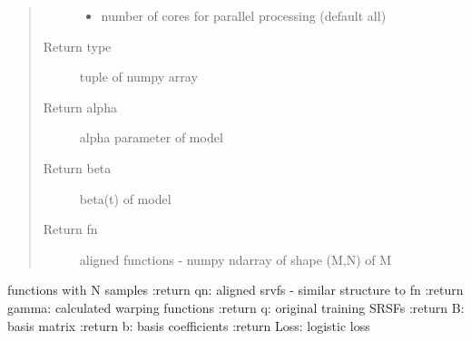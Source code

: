\documentclass[letterpaper,10pt,english]{sphinxmanual}
\begin{document}
\begin{fulllineitems}
\begin{quote}
\begin{description}
\begin{itemize}
\item {} 
 \textendash{} number of cores for parallel processing (default all)

\end{itemize}

\item[{Return type}] \leavevmode
tuple of numpy array

\item[{Return alpha}] \leavevmode
alpha parameter of model

\item[{Return beta}] \leavevmode
beta(t) of model

\item[{Return fn}] \leavevmode
aligned functions - numpy ndarray of shape (M,N) of M

\end{description}\end{quote}

functions with N samples
:return qn: aligned srvfs - similar structure to fn
:return gamma: calculated warping functions
:return q: original training SRSFs
:return B: basis matrix
:return b: basis coefficients
:return Loss: logistic loss

\end{fulllineitems}

\end{document}
